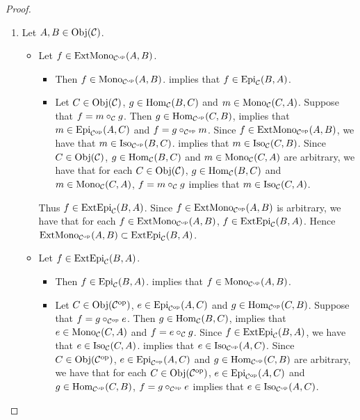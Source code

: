 \documentclass{book}
\begin{document}
	\begin{proof}\
		\begin{enumerate}
			\item Let $A,B \in \Obj(\MC)$. 
			\begin{itemize}
				\item Let $f \in \ExtMono_{\op{\MC}}(A, B)$. 
				\begin{itemize}
					\item Then $f \in \Mono_{\op{\MC}}(A, B)$.  implies that $f \in \Epi_{\MC}(B, A)$. 
					\item Let $C \in \Obj(\MC)$, $g \in \Hom_{\MC}(B,C)$ and $m \in \Mono_{\MC}(C,A)$. Suppose that $f = m \circ_{\MC} g$. Then $g \in \Hom_{\op{\MC}}(C,B)$,  implies that $m \in \Epi_{\op{\MC}}(A,C)$ and $f = g \circ_{\op{\MC}} m$. Since $f \in \ExtMono_{\op{\MC}}(A, B)$, we have that $m \in \Iso_{\op{\MC}}(B, C)$. \rex{}  implies that $m \in \Iso_{\MC}(C, B)$. Since $C \in \Obj(\MC)$, $g \in \Hom_{\MC}(B,C)$ and $m \in \Mono_{\MC}(C,A)$ are arbitrary, we have that for each $C \in \Obj(\MC)$, $g \in \Hom_{\MC}(B,C)$ and $m \in \Mono_{\MC}(C,A)$, $f = m \circ_{\MC} g$ implies that $m \in \Iso_{\MC}(C, A)$.
				\end{itemize}
				Thus $f \in \ExtEpi_{\MC}(B, A)$. Since $f \in \ExtMono_{\op{\MC}}(A, B)$ is arbitrary, we have that for each $f \in \ExtMono_{\op{\MC}}(A, B)$, $f \in \ExtEpi_{\MC}(B, A)$. Hence $\ExtMono_{\op{\MC}}(A, B) \subset \ExtEpi_{\MC}(B, A)$.
				\item Let $f \in \ExtEpi_{\MC}(B, A)$. 
				\begin{itemize}
					\item Then $f \in \Epi_{\MC}(B, A)$.  implies that $f \in \Mono_{\op{\MC}}(A, B)$.
					\item  Let $C \in \Obj(\op{\MC})$, $e \in \Epi_{\op{\MC}}(A,C)$ and $g \in \Hom_{\op{\MC}}(C,B)$. Suppose that $f = g \circ_{\op{\MC}} e$. Then $g \in \Hom_{\MC}(B,C)$,  implies that $e \in \Mono_{\MC}(C, A)$ and $f = e \circ_{\MC} g$. Since $f \in \ExtEpi_{\MC}(B, A)$, we have that $e \in \Iso_{\MC}(C, A)$. \rex{}  implies that $e \in \Iso_{\op{\MC}}(A, C)$. Since $C \in \Obj(\op{\MC})$, $e \in \Epi_{\op{\MC}}(A,C)$ and $g \in \Hom_{\op{\MC}}(C,B)$ are arbitrary, we have that for each $C \in \Obj(\op{\MC})$, $e \in \Epi_{\op{\MC}}(A,C)$ and $g \in \Hom_{\op{\MC}}(C,B)$, $f = g \circ_{\op{\MC}} e$ implies that $e \in \Iso_{\op{\MC}}(A, C)$.

\end{itemize}
\end{itemize}
\end{enumerate}
\end{proof}
\end{document}
